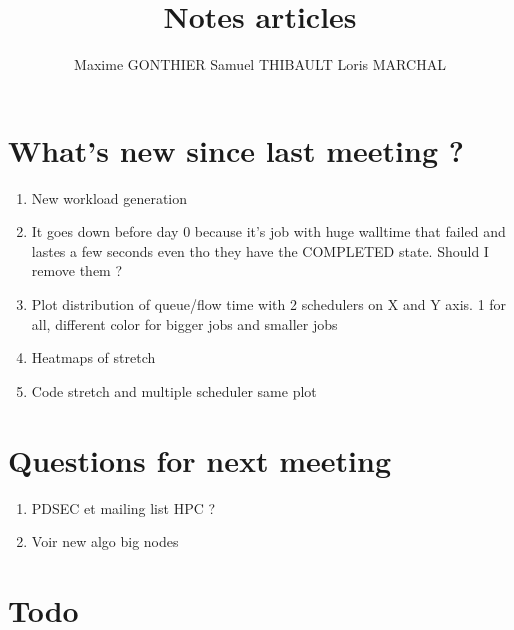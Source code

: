 \documentclass[a4paper]{article}
\title{Notes articles}
\author{Maxime GONTHIER Samuel THIBAULT Loris MARCHAL}
\begin{document}
\newpage

\section{What's new since last meeting ?}

	\begin{enumerate}
		\item New workload generation
		\item It goes down before day 0 because it's job with huge walltime that failed and lastes a few seconds even tho they have the COMPLETED state. Should I remove them ?
		\item Plot distribution of queue/flow time with 2 schedulers on X and Y axis. 1 for all, different color for bigger jobs and smaller jobs
		\item Heatmaps of stretch
		\item Code stretch and multiple scheduler same plot
	\end{enumerate}
	
\section{Questions for next meeting}

	\begin{enumerate}
		\item PDSEC et mailing list HPC ?
		\item Voir new algo big nodes
	\end{enumerate}

\section{Todo}
\end{document}
